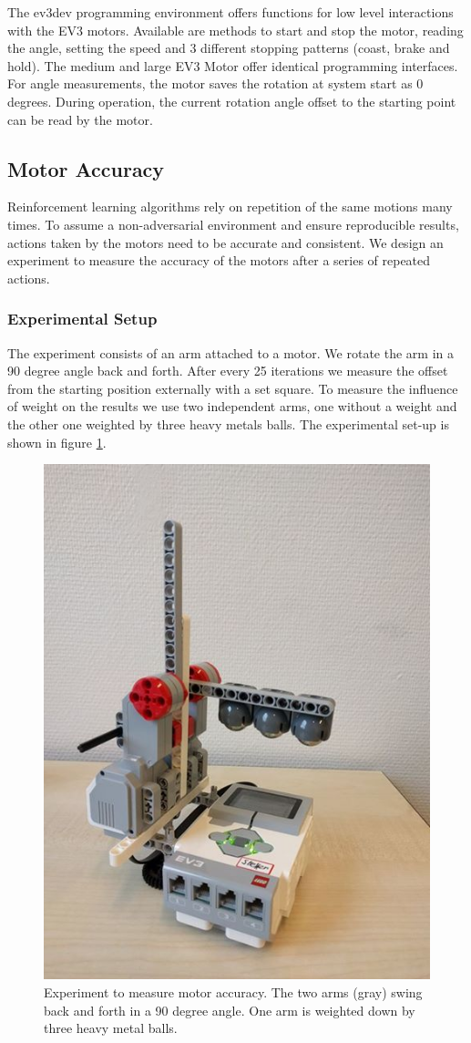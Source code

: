 \documentclass[11pt, a4paper]{article}
\begin{document}
The ev3dev programming environment offers functions for low level interactions with the EV3 motors. Available are methods to start and stop the motor, reading the angle, setting the speed and 3 different stopping patterns (coast, brake and hold). The medium and large EV3 Motor offer identical programming interfaces. For angle measurements, the motor saves the rotation at system start as 0 degrees. During operation, the current rotation angle offset to the starting point can be read by the motor. \cite{ev3_python}

\subsection*{Motor Accuracy}
Reinforcement learning algorithms rely on repetition of the same motions many times. To assume a non-adversarial environment and ensure reproducible results, actions taken by the motors need to be accurate and consistent. We design an experiment to measure the accuracy of the motors after a series of repeated actions.

\subsubsection*{Experimental Setup}
The experiment consists of an arm attached to a motor. We rotate the arm in a 90 degree angle back and forth. After every 25 iterations we measure the offset from the starting position externally with a set square. To measure the influence of weight on the results we use two independent arms, one without a weight and the other one weighted by three heavy metals balls. The experimental set-up is shown in figure \ref{fig:angle_experiment}.

\begin{figure}
\centering
\includegraphics[width=0.35\linewidth]{images/angle_experiment}
\caption{Experiment to measure motor accuracy. The two arms (gray) swing back and forth in a 90 degree angle. One arm is weighted down by three heavy metal balls.}
\label{fig:angle_experiment}
\end{figure}
\end{document}
